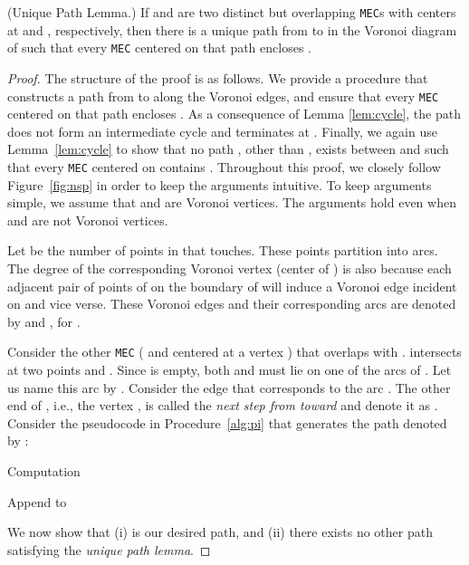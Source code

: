 \documentclass[12pt]{llncs}
\begin{document}
\begin{lemma}(Unique Path Lemma.)
If  and  are two distinct but overlapping {\tt MEC}s with centers
at  and , respectively, then there is a unique path  
from  to  in  the Voronoi diagram of  such that every {\tt MEC} centered 
on that path encloses .
\end{lemma}

\begin{proof}
 The structure of the proof is as follows. We provide a procedure that 
constructs a path  from  to  along the Voronoi
edges, and ensure that every {\tt MEC} centered on that path encloses . As a consequence of Lemma \ref{lem:cycle}, the path does not
form an intermediate cycle and terminates at . Finally, we again
use Lemma~\ref{lem:cycle} to show that no path , other than
, exists between  and  such that every {\tt MEC} centered
on  contains . Throughout this proof, we closely follow
Figure~\ref{fig:nsp} in order to keep the arguments intuitive. To keep
arguments simple, we assume that  and  are Voronoi vertices. The arguments 
hold 
even
when  and  are not Voronoi vertices. 

Let  be the number of points in  that   touches. These
 points partition   into  arcs. The degree of
the corresponding Voronoi vertex  (center of ) is also  because each
adjacent pair of points of  on the boundary of  will
induce a Voronoi edge incident on  and vice verse. These Voronoi
edges and their corresponding arcs are denoted by  and ,
for .


Consider the other  {\tt MEC}  ( and centered at a vertex )
that overlaps with .  intersects  at two points  and
. Since  is empty, both  and  must lie on one of the  arcs 
of
. Let us name this arc by .
Consider the edge  that corresponds to the arc
. The other end of , i.e., the vertex , is called
the {\em next step from  toward } and denote it as
. Consider the pseudocode in Procedure~\ref{alg:pi} that generates 
the 
path
denoted by :


\begin{algorithm}[h!]
\caption{ Computation}
\label{alg:pi}
\begin{algorithmic}[1]
\STATE 
\STATE 
\REPEAT
\STATE 
\STATE Append  to 
\end{algorithmic}
\end{algorithm}

We now show that (i)  is our desired path, and 
(ii) there exists no other path satisfying the {\it unique path lemma}.


\end{proof}
\end{document}
